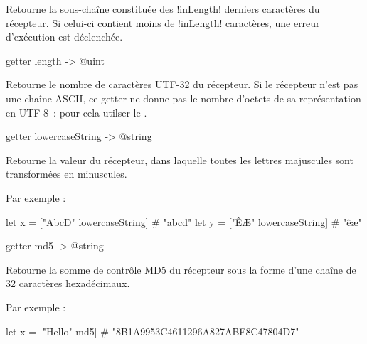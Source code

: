 Retourne la sous-chaîne constituée des \ggs!inLength! derniers caractères du récepteur. Si celui-ci contient moins de \ggs!inLength! caractères, une erreur d'exécution est déclenchée.









\begin{galgasbox}
getter length -> @uint
\end{galgasbox}

Retourne le nombre de caractères UTF-32 du récepteur. Si le récepteur n'est pas une chaîne ASCII, ce getter ne donne pas le nombre d'octets de sa représentation en UTF-8~: pour cela utilser le .









\begin{galgasbox}
getter lowercaseString -> @string
\end{galgasbox}

Retourne la valeur du récepteur, dans laquelle toutes les lettres majuscules sont transformées en minuscules.

Par exemple :
\begin{galgas}
let x = ["AbcD" lowercaseString] # "abcd"
let y = ["ÊÆ" lowercaseString] # "êæ"
\end{galgas}








\begin{galgasbox}
getter md5 -> @string
\end{galgasbox}

Retourne la somme de contrôle MD5 du récepteur sous la forme d'une chaîne de 32 caractères hexadécimaux.

Par exemple :
\begin{galgas}
let x = ["Hello" md5] # "8B1A9953C4611296A827ABF8C47804D7"
\end{galgas}








